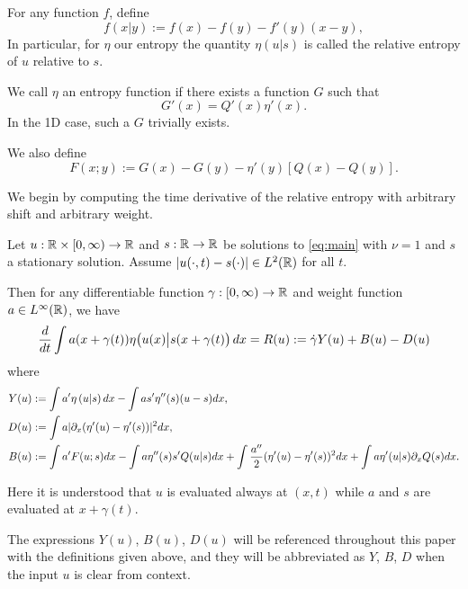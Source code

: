 For any function $f$, define
\[ f(x|y) := f(x) - f(y) - f'(y)(x-y),\]
In particular, for $\eta$ our entropy the quantity $\eta(u|s)$ is called the relative entropy of $u$ relative to $s$.  

We call $\eta$ an entropy function if there exists a function $G$ such that
\[ G'(x) = Q'(x) \eta'(x).\]
In the 1D case, such a $G$ trivially exists.  

We also define
\[ F(x;y) := G(x) - G(y) - \eta'(y)\left[ Q(x) - Q(y) \right].\]

We begin by computing the time derivative of the relative entropy with arbitrary shift and arbitrary weight. 

\begin{proposition}\label{thm:time derivative}
Let $u:\mathbb{R} \times [0,\infty) \to \mathbb{R}$ and $s:\mathbb{R} \to \mathbb{R}$ be solutions to \eqref{eq:main} with $\nu=1$ and $s$ a stationary solution.  Assume $\left\lvert u(\cdot,t) - s(\cdot) \right\rvert \in L^2(\mathbb{R})$ for all $t$.  

Then for any differentiable function $\gamma:[0,\infty) \to \mathbb{R}$ and weight function $a \in L^\infty(\mathbb{R})$, we have
\[ \frac{d}{dt} \int a(x+\gamma(t)) \eta\big(u(x)\big|s(x+\gamma(t)\big) \,dx = R(u) := \dot{\gamma} Y(u) + B(u) - D(u) \]
where
\begin{align*}
Y(u) &:= \int a' \eta\left(u|s\right) dx - \int a s' \eta''(s)(u-s) dx, \\
D(u) &:= \int a |\partial_x (\eta'(u) - \eta'(s))|^2 dx, \\
B(u) &:= \int a' F(u;s) dx - \int a \eta''(s)s'Q(u|s) dx + \int \frac{a''}{2} (\eta'(u) - \eta'(s))^2 dx  + \int a \eta'(u|s) \partial_x Q(s) dx.
\end{align*}

Here it is understood that $u$ is evaluated always at $(x,t)$ while $a$ and $s$ are evaluated at $x+\gamma(t)$.  
\end{proposition}

The expressions $Y(u)$, $B(u)$, $D(u)$ will be referenced throughout this paper with the definitions given above, and they will be abbreviated as $Y$, $B$, $D$ when the input $u$ is clear from context.  

